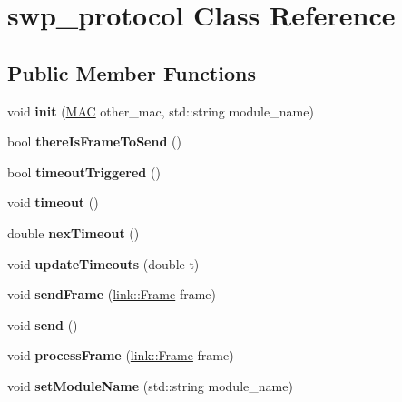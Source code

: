 \hypertarget{classswp__protocol}{}\section{swp\+\_\+protocol Class Reference}
\label{classswp__protocol}
\subsection*{Public Member Functions}
\begin{DoxyCompactItemize}
\item 
void {\bfseries init} (\hyperlink{structMAC}{M\+AC} other\+\_\+mac, std\+::string module\+\_\+name)\hypertarget{classswp__protocol_ac75ad403a0e67ee52f55845a5649daf8}{}\label{classswp__protocol_ac75ad403a0e67ee52f55845a5649daf8}

\item 
bool {\bfseries there\+Is\+Frame\+To\+Send} ()\hypertarget{classswp__protocol_a573d06b53b641a8f9354956e1aae8d42}{}\label{classswp__protocol_a573d06b53b641a8f9354956e1aae8d42}

\item 
bool {\bfseries timeout\+Triggered} ()\hypertarget{classswp__protocol_ae5bb244e5dd8eb44cd2550ca270ee80b}{}\label{classswp__protocol_ae5bb244e5dd8eb44cd2550ca270ee80b}

\item 
void {\bfseries timeout} ()\hypertarget{classswp__protocol_af7e9869bf57452799f53effa6cb02ddd}{}\label{classswp__protocol_af7e9869bf57452799f53effa6cb02ddd}

\item 
double {\bfseries nex\+Timeout} ()\hypertarget{classswp__protocol_ae9dca95b848d2c6c3c2f429152ae0929}{}\label{classswp__protocol_ae9dca95b848d2c6c3c2f429152ae0929}

\item 
void {\bfseries update\+Timeouts} (double t)\hypertarget{classswp__protocol_abe07df0326dbf0b8d5c1a59b1e4f6dc7}{}\label{classswp__protocol_abe07df0326dbf0b8d5c1a59b1e4f6dc7}

\item 
void {\bfseries send\+Frame} (\hyperlink{structlink_1_1Frame}{link\+::\+Frame} frame)\hypertarget{classswp__protocol_a6d5c49fbcaf4d540ee065b862df339ae}{}\label{classswp__protocol_a6d5c49fbcaf4d540ee065b862df339ae}

\item 
void {\bfseries send} ()\hypertarget{classswp__protocol_a25a7db2cad83583871ae98437b360847}{}\label{classswp__protocol_a25a7db2cad83583871ae98437b360847}

\item 
void {\bfseries process\+Frame} (\hyperlink{structlink_1_1Frame}{link\+::\+Frame} frame)\hypertarget{classswp__protocol_a37f388591cdea5b3cac8a7bf3a829e2b}{}\label{classswp__protocol_a37f388591cdea5b3cac8a7bf3a829e2b}

\item 
void {\bfseries set\+Module\+Name} (std\+::string module\+\_\+name)\hypertarget{classswp__protocol_aad7851e8e2708a8e23eaf1a6fa8637c8}{}\label{classswp__protocol_aad7851e8e2708a8e23eaf1a6fa8637c8}

\end{DoxyCompactItemize}
